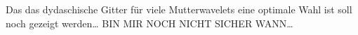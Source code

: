 \documentclass[a4paper,11pt,bibliography=totoc,listof=totoc,headinclude=true,cleardoublepage=empty,oneside]{scrbook}
\theoremstyle{definition}
\theoremstyle{remark}
\begin{document}
  Das das dydaschische Gitter für viele Mutterwavelets eine optimale Wahl ist soll noch gezeigt werden\dots
  BIN MIR NOCH NICHT SICHER WANN\dots
  


  

%
%
%
%
%
%
%
%
%
%
%
%
%
%
\end{document}
